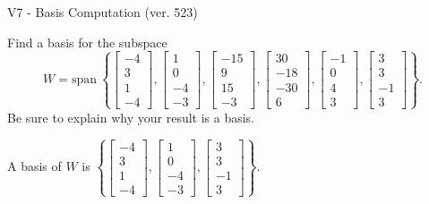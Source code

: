 \begin{exercise}
  \begin{exerciseTitle}V7 - Basis Computation (ver. 523)\end{exerciseTitle}
  \begin{exerciseStatement}
    Find a basis for the subspace 
\[W=\mathrm{span}\ \left\{\left[\begin{array}{r}
-4 \\
3 \\
1 \\
-4
\end{array}\right] , \left[\begin{array}{r}
1 \\
0 \\
-4 \\
-3
\end{array}\right] , \left[\begin{array}{r}
-15 \\
9 \\
15 \\
-3
\end{array}\right] , \left[\begin{array}{r}
30 \\
-18 \\
-30 \\
6
\end{array}\right] , \left[\begin{array}{r}
-1 \\
0 \\
4 \\
3
\end{array}\right] , \left[\begin{array}{r}
3 \\
3 \\
-1 \\
3
\end{array}\right]\right\}.\]
 Be sure to explain why your result is a basis.


  \end{exerciseStatement}
  \begin{exerciseAnswer}
   A basis of \(W\) is  \(\left\{\left[\begin{array}{r}
-4 \\
3 \\
1 \\
-4
\end{array}\right] , \left[\begin{array}{r}
1 \\
0 \\
-4 \\
-3
\end{array}\right] , \left[\begin{array}{r}
3 \\
3 \\
-1 \\
3
\end{array}\right]\right\}\).
  


  \end{exerciseAnswer}
\end{exercise}